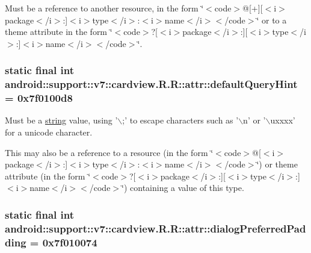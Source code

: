 Must be a reference to another resource, in the form \char`\"{}$<$code$>$@\mbox{[}+\mbox{]}\mbox{[}$<$i$>$package$<$/i$>$:\mbox{]}$<$i$>$type$<$/i$>$:$<$i$>$name$<$/i$>$$<$/code$>$\char`\"{} or to a theme attribute in the form \char`\"{}$<$code$>$?\mbox{[}$<$i$>$package$<$/i$>$:\mbox{]}\mbox{[}$<$i$>$type$<$/i$>$:\mbox{]}$<$i$>$name$<$/i$>$$<$/code$>$\char`\"{}. \hypertarget{classandroid_1_1support_1_1v7_1_1cardview_1_1_r_1_1attr_900541a2ff6d97c6835149232ff9088a}{
\subsubsection[{defaultQueryHint}]{\setlength{\rightskip}{0pt plus 5cm}static final int android::support::v7::cardview.R.R::attr::defaultQueryHint = 0x7f0100d8}}
\label{classandroid_1_1support_1_1v7_1_1cardview_1_1_r_1_1attr_900541a2ff6d97c6835149232ff9088a}


Must be a \hyperlink{classandroid_1_1support_1_1v7_1_1cardview_1_1_r_1_1string}{string} value, using '$\backslash$;' to escape characters such as '$\backslash$n' or '$\backslash$uxxxx' for a unicode character. 

This may also be a reference to a resource (in the form \char`\"{}$<$code$>$@\mbox{[}$<$i$>$package$<$/i$>$:\mbox{]}$<$i$>$type$<$/i$>$:$<$i$>$name$<$/i$>$$<$/code$>$\char`\"{}) or theme attribute (in the form \char`\"{}$<$code$>$?\mbox{[}$<$i$>$package$<$/i$>$:\mbox{]}\mbox{[}$<$i$>$type$<$/i$>$:\mbox{]}$<$i$>$name$<$/i$>$$<$/code$>$\char`\"{}) containing a value of this type. \hypertarget{classandroid_1_1support_1_1v7_1_1cardview_1_1_r_1_1attr_f46a4764b24319ac6006805a0b84a117}{
\subsubsection[{dialogPreferredPadding}]{\setlength{\rightskip}{0pt plus 5cm}static final int android::support::v7::cardview.R.R::attr::dialogPreferredPadding = 0x7f010074}}
\label{classandroid_1_1support_1_1v7_1_1cardview_1_1_r_1_1attr_f46a4764b24319ac6006805a0b84a117}


